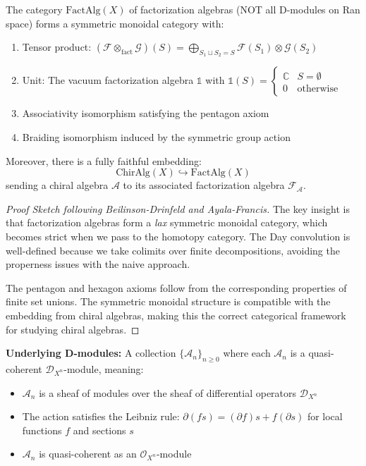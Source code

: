 \begin{theorem}\label{thm:fact-monoidal-corrected}
The category $\text{FactAlg}(X)$ of factorization algebras (NOT all D-modules on Ran space) forms a symmetric monoidal 
category with:
\begin{enumerate}
\item Tensor product: $(\mathcal{F} \otimes_{\text{fact}} \mathcal{G})(S) = \bigoplus_{S_1 \sqcup S_2 = S} \mathcal{F}(S_1) \otimes \mathcal{G}(S_2)$
\item Unit: The vacuum factorization algebra $\mathbb{1}$ with $\mathbb{1}(S) = \begin{cases} \mathbb{C} & S = \emptyset \\ 0 & \text{otherwise} \end{cases}$
\item Associativity isomorphism satisfying the pentagon axiom
\item Braiding isomorphism induced by the symmetric group action
\end{enumerate}

Moreover, there is a fully faithful embedding:
$$\text{ChirAlg}(X) \hookrightarrow \text{FactAlg}(X)$$
sending a chiral algebra $\mathcal{A}$ to its associated factorization algebra $\mathcal{F}_{\mathcal{A}}$.
\end{theorem}

\begin{proof}[Proof Sketch following Beilinson-Drinfeld and Ayala-Francis]
The key insight is that factorization algebras form a \emph{lax} symmetric monoidal category, which becomes 
strict when we pass to the homotopy category. The Day convolution is well-defined because we take colimits 
over finite decompositions, avoiding the properness issues with the naive approach.

The pentagon and hexagon axioms follow from the corresponding properties of finite set unions. The 
symmetric monoidal structure is compatible with the embedding from chiral algebras, making this the 
correct categorical framework for studying chiral algebras.
\end{proof}

\textbf{Underlying D-modules:} A collection $\{\mathcal{A}_n\}_{n \geq 0}$ where each $\mathcal{A}_n$ is a quasi-coherent $\mathcal{D}_{X^n}$-module, meaning:
\begin{itemize}
\item $\mathcal{A}_n$ is a sheaf of modules over the sheaf of differential operators $\mathcal{D}_{X^n}$
\item The action satisfies the Leibniz rule: $\partial(fs) = (\partial f)s + f(\partial s)$ for local functions $f$ and sections $s$
\item $\mathcal{A}_n$ is quasi-coherent as an $\mathcal{O}_{X^n}$-module
\end{itemize}

